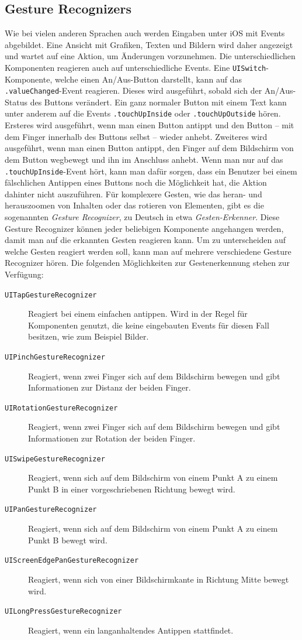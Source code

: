 \subsection{Gesture Recognizers}
\label{subsec:gesturerecognizer}
Wie bei vielen anderen Sprachen auch werden Eingaben unter iOS mit Events abgebildet.
Eine Ansicht mit Grafiken, Texten und Bildern wird daher angezeigt und wartet auf eine Aktion, um Änderungen vorzunehmen.
Die unterschiedlichen Komponenten reagieren auch auf unterschiedliche Events.
Eine \texttt{UISwitch}-Komponente, welche einen An/Aus-Button darstellt, kann auf das \texttt{.valueChanged}-Event reagieren.
Dieses wird ausgeführt, sobald sich der An/Aus-Status des Buttons verändert.
Ein ganz normaler Button mit einem Text kann unter anderem auf die Events \texttt{.touchUpInside} oder \texttt{.touchUpOutside} hören.
Ersteres wird ausgeführt, wenn man einen Button antippt und den Button – mit dem Finger innerhalb des Buttons selbst – wieder anhebt.
Zweiteres wird ausgeführt, wenn man einen Button antippt, den Finger auf dem Bildschirm von dem Button wegbewegt und ihn im Anschluss anhebt.
Wenn man nur auf das \texttt{.touchUpInside}-Event hört, kann man dafür sorgen, dass ein Benutzer bei einem fälschlichen Antippen eines Buttons noch die Möglichkeit hat, die Aktion dahinter nicht auszuführen.\pbreak%
%
Für komplexere Gesten, wie das heran- und herauszoomen von Inhalten oder das rotieren von Elementen, gibt es die sogenannten \emph{Gesture Recognizer}, zu Deutsch in etwa \emph{Gesten-Erkenner}.
Diese Gesture Recognizer können jeder beliebigen Komponente angehangen werden, damit man auf die erkannten Gesten reagieren kann.
Um zu unterscheiden auf welche Gesten reagiert werden soll, kann man auf mehrere verschiedene Gesture Recognizer hören.
Die folgenden Möglichkeiten zur Gestenerkennung stehen zur Verfügung:
\begin{description}
	\item[\texttt{UITapGestureRecognizer}] Reagiert bei einem einfachen antippen. Wird in der Regel für Komponenten genutzt, die keine eingebauten Events für diesen Fall besitzen, wie zum Beispiel Bilder.
	\item[\texttt{UIPinchGestureRecognizer}] Reagiert, wenn zwei Finger sich auf dem Bildschirm bewegen und gibt Informationen zur Distanz der beiden Finger.
	\item[\texttt{UIRotationGestureRecognizer}] Reagiert, wenn zwei Finger sich auf dem Bildschirm bewegen und gibt Informationen zur Rotation der beiden Finger.
	\item[\texttt{UISwipeGestureRecognizer}] Reagiert, wenn sich auf dem Bildschirm von einem Punkt A zu einem Punkt B in einer vorgeschriebenen Richtung bewegt wird.
	\item[\texttt{UIPanGestureRecognizer}] Reagiert, wenn sich auf dem Bildschirm von einem Punkt A zu einem Punkt B bewegt wird.
	\item[\texttt{UIScreenEdgePanGestureRecognizer}] Reagiert, wenn sich von einer Bildschirmkante in Richtung Mitte bewegt wird.
	\item[\texttt{UILongPressGestureRecognizer}] Reagiert, wenn ein langanhaltendes Antippen stattfindet.
\end{description}
